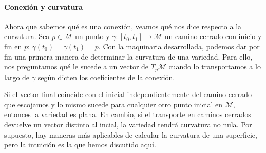 \paragraph{Conexión y curvatura}
Ahora que sabemos qué es una conexión, veamos qué nos dice respecto a la curvatura. Sea \(p\in\mathcal{M}\) un punto y \(\gamma:[t_0, t_1]\rightarrow\mathcal{M}\) un camino cerrado con inicio y fin en \(p\): \(\gamma(t_0) = \gamma(t_1) = p\). Con la maquinaria desarrollada, podemos dar por fin una primera manera de determinar la curvatura de una variedad. Para ello, nos preguntamos qué le sucede a un vector de \(T_p\mathcal{M}\) cuando lo transportamos a lo largo de \(\gamma\) según dicten los coeficientes de la conexión.

Si el vector final coincide con el inicial independientemente del camino cerrado que escojamos y lo mismo sucede para cualquier otro punto inicial en \(\mathcal{M}\), entonces la variedad es plana. En cambio, si el transporte en caminos cerrados devuelve un vector distinto al incial, la variedad tendrá curvatura no nula. Por supuesto, hay maneras más aplicables de calcular la curvatura de una superficie, pero la intuición es la que hemos discutido aquí. 

